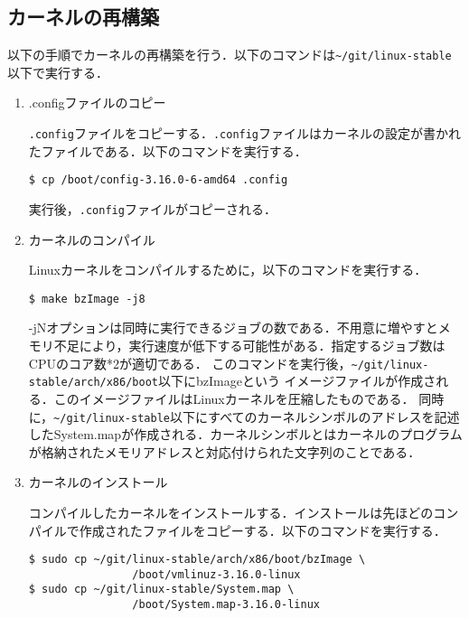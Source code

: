 \documentclass[12pt]{jsarticle}
\begin{document}
\subsection{カーネルの再構築}\label{subsec:rebuild kernel}
以下の手順でカーネルの再構築を行う．以下のコマンドは\verb|~/git/linux-stable|以下で実行する．
\begin{enumerate}
\item .configファイルのコピー \label{enum:make config}

\verb|.config|ファイルをコピーする．\verb|.config|ファイルはカーネルの設定が書かれたファイルである．以下のコマンドを実行する．
\begin{verbatim}
$ cp /boot/config-3.16.0-6-amd64 .config
\end{verbatim}
実行後，\verb|.config|ファイルがコピーされる．

\item カーネルのコンパイル \label{enum:compile kernel}

Linuxカーネルをコンパイルするために，以下のコマンドを実行する．
\begin{verbatim}
$ make bzImage -j8
\end{verbatim}
-jNオプションは同時に実行できるジョブの数である．不用意に増やすとメモリ不足により，実行速度が低下する可能性がある．指定するジョブ数はCPUのコア数*2が適切である．
このコマンドを実行後，\verb|~/git/linux-stable/arch/x86/boot|以下にbzImageという
イメージファイルが作成される．このイメージファイルはLinuxカーネルを圧縮したものである．
同時に，\verb|~/git/linux-stable|以下にすべてのカーネルシンボルのアドレスを記述したSystem.mapが作成される．カーネルシンボルとはカーネルのプログラムが格納されたメモリアドレスと対応付けられた文字列のことである．

\item カーネルのインストール \label{enum:kernel install}

コンパイルしたカーネルをインストールする．インストールは先ほどのコンパイルで作成されたファイルをコピーする．以下のコマンドを実行する．
\begin{verbatim}
$ sudo cp ~/git/linux-stable/arch/x86/boot/bzImage \
                /boot/vmlinuz-3.16.0-linux
$ sudo cp ~/git/linux-stable/System.map \
                /boot/System.map-3.16.0-linux
\end{verbatim}


\end{enumerate}
\end{document}

